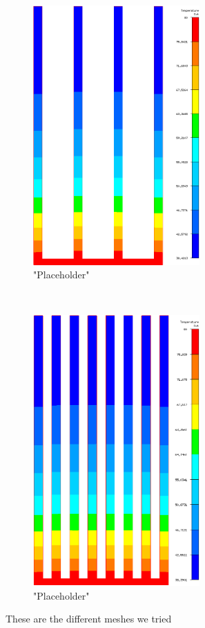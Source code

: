 \begin{figure}[h]
\begin{subfigure}[t] {0.23\textwidth}
 \includegraphics[width=0.7\textwidth]{../figures/heatsink4_h205_gmf005.png}
 \caption{"Placeholder"}
 \label{fig:res_4_2}
 \end{subfigure}
 ~
 \begin{subfigure}[t] {0.23\textwidth}
 \centering
 \includegraphics[width=0.7\textwidth]{../figures/heatsink8_h205_gmf005.png}
 \caption{"Placeholder"}
 \label{fig:res_8_2}
 \end{subfigure}
 \caption{These are the different meshes we tried}
 \label{fig:mesh_temps}
 \end{figure}
 
